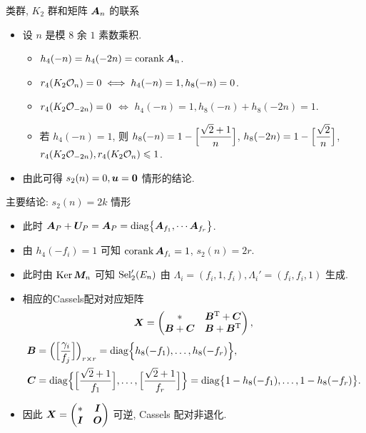 \documentclass[handout,aspectratio=169]{ctexbeamer}
\renewcommand\aleg[2]{\Bigl[\dfrac{{#1}}{#2}\Bigr]}
\begin{document}
\begin{frame}{类群, $K_2$ 群和矩阵 ${\boldsymbol{A}}_n$ 的联系}
	\begin{itemize}
		\item 设 $n$ 是模 $8$ 余 $1$ 素数乘积.
		\begin{itemize}
			\item $h_4(-n)=h_4(-2n)=\operatorname{corank}{\boldsymbol{A}}_n$.
			\item $r_4(K_2{\mathcal{O}}_n)=0\iff h_4(-n)=1,h_8(-n)=0$.
			\item $r_4(K_2{\mathcal{O}}_{-2n})=0$ $\iff$ $h_4(-n)=1,h_8(-n)+h_8(-2n)=1$.
			\item 若 $h_4(-n)=1$, 则 $h_8(-n)=1-\aleg{\sqrt2+1}{n}$,  $h_8(-2n)=1-\aleg{\sqrt2}{n}$, $r_4(K_2{\mathcal{O}}_{-2n}),r_4(K_2{\mathcal{O}}_n)\leqslant 1$.
		\end{itemize}
		\item 由此可得 $s_2(n)=0,{\boldsymbol{u}}={\bf0}$ 情形的结论.
	\end{itemize}
\end{frame}


\begin{frame}{主要结论: $s_2(n)=2k$ 情形}
	\begin{itemize}
		\item 此时 ${\boldsymbol{A}}_P+{\boldsymbol{U}}_P={\boldsymbol{A}}_P={\mathrm{diag}}\bigl\{
				{\boldsymbol{A}}_{f_1},\cdots {\boldsymbol{A}}_{f_r}
			\bigr\}$.
		\item 由 $h_4(-f_i)=1$ 可知 $\operatorname{corank} {\boldsymbol{A}}_{f_i}=1$, $s_2(n)=2r$.
		\item 此时由 $\operatorname{Ker}{\boldsymbol{M}}_n$ 可知 ${\mathrm{Sel}}_2'(E_n)$ 由 $\Lambda_i=(f_i,1,f_i),\Lambda_i'=(f_i,f_i,1)$ 生成.
		\item 相应的Cassels配对对应矩阵
		\[
			{\boldsymbol{X}}=\begin{pmatrix}
				*&{\boldsymbol{B}}^{\mathrm{T}}+{\boldsymbol{C}}\\{\boldsymbol{B}}+{\boldsymbol{C}}&{\boldsymbol{B}}+{\boldsymbol{B}}^{\mathrm{T}}
			\end{pmatrix},
		\]
		\begin{align*}
			\bfB&
			=\Bigl(\aleg{\gamma_i}{f_j}\Bigr)_{r\times r}
			=\diag\Bigl\{h_8(-f_1),\dots,h_8(-f_r)\Bigr\},\\
			\bfC&
			=\diag\Bigl\{\aleg{\sqrt2+1}{f_1},\dots,\aleg{\sqrt2+1}{f_r}\Bigr\}
			=\diag\bigl\{1-h_8(-f_1),\dots,1-h_8(-f_r)\bigr\}.
		\end{align*}
		\item 因此 ${\boldsymbol{X}}=\begin{pmatrix}
			*&{\boldsymbol{I}}\\{\boldsymbol{I}}&{\boldsymbol{O}}
		\end{pmatrix}$ 可逆, Cassels 配对非退化.
	\end{itemize}
\end{frame}
\end{document}
